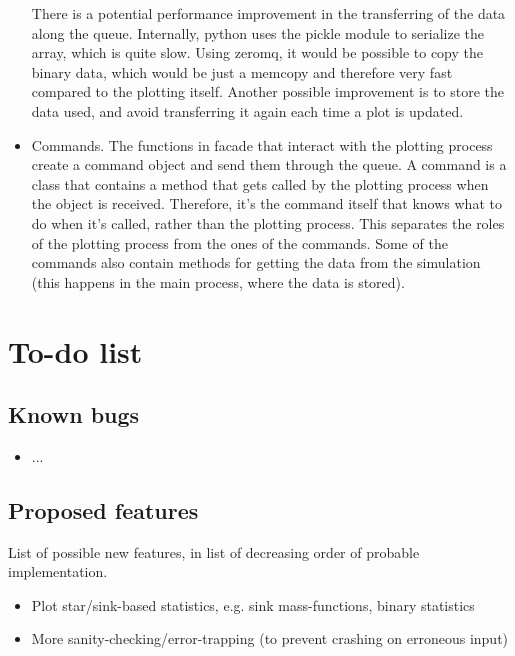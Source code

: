 \documentclass[a4paper]{article}
\begin{document}
\begin{itemize}
There is a potential performance improvement in the transferring of the data along the queue. Internally, python uses the pickle module to serialize the array, which is quite slow. Using zeromq, it would be possible to copy the binary data, which would be just a memcopy and therefore very fast compared to the plotting itself. Another possible improvement is to store the data used, and avoid transferring it again each time a plot is updated.

\item Commands. The functions in facade that interact with the plotting process create a command object and send them through the queue. A command is a class that contains a method that gets called by the plotting process when the object is received. Therefore, it's the command itself that knows what to do when it's called, rather than the plotting process. This separates the roles of the plotting process from the ones of the commands. Some of the commands also contain methods for getting the data from the simulation (this happens in the main process, where the data is stored).


\end{itemize}

\section{To-do list}

\subsection{Known bugs}
\begin{itemize}
\item ...
\end{itemize}


\subsection{Proposed features}
List of possible new features, in list of decreasing order of probable implementation.
\begin{itemize}
\item Plot star/sink-based statistics, e.g. sink mass-functions, binary statistics
\item More sanity-checking/error-trapping (to prevent crashing on erroneous input)
\end{itemize}
\end{document}

